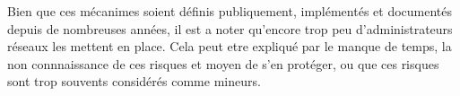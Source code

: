 Bien que ces mécanimes soient définis publiquement, implémentés et documentés depuis de nombreuses années, il est a noter qu'encore trop peu d'administrateurs réseaux les mettent en place. Cela peut etre expliqué par le manque de temps, la non connnaissance de ces risques et moyen de s'en protéger, ou que ces risques sont trop souvents considérés comme mineurs.



